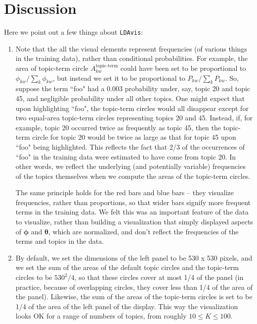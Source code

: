 \documentclass[12pt]{article}
\begin{document}
\section{Discussion}
Here we point out a few things about \texttt{LDAvis}:
\begin{enumerate}
\item Note that the all the visual elements represent frequencies (of various things in the training data), rather than conditional probabilities. For example, the area of topic-term circle $A^\text{topic-term}_{kw}$ could have been set to be proportional to $\phi_{kw}/\sum_k \phi_{kw}$, but instead we set it to be proportional to $P_{kw}/\sum_k P_{kw}$. So, suppose the term ``foo" had a 0.003 probability under, say, topic 20 and topic 45, and negligible probability under all other topics. One might expect that upon highlighting ``foo", the topic-term circles would all disappear except for two equal-area topic-term circles representing topics 20 and 45. Instead, if, for example, topic 20 occurred twice as frequently as topic 45, then the topic-term circle for topic 20 would be twice as large as that for topic 45 upon ``foo" being highlighted. This reflects the fact that 2/3 of the occurrences of ``foo" in the training data were estimated to have come from topic 20. In other words, we reflect the underlying (and potentially variable) frequencies of the topics themselves when we compute the areas of the topic-term circles.

The same principle holds for the red bars and blue bars -- they visualize frequencies, rather than proportions, so that wider bars signify more frequent terms in the training data. We felt this was an important feature of the data to visualize, rather than building a visualization that simply displayed aspects of $\boldsymbol{\phi}$ and $\boldsymbol{\theta}$, which are normalized, and don't reflect the frequencies of the terms and topics in the data.

\item By default, we set the dimensions of the left panel to be 530 x 530 pixels, and we set the sum of the areas of the default topic circles and the topic-term circles to be $530^2/4$, so that these circles cover at most 1/4 of the panel (in practice, because of overlapping circles, they cover less than 1/4 of the area of the panel). Likewise, the sum of the areas of the topic-term circles is set to be 1/4 of the area of the left panel of the display. This way the visualization looks OK for a range of numbers of topics, from roughly $10 \leq K \leq 100$.


\end{enumerate}
\end{document}
